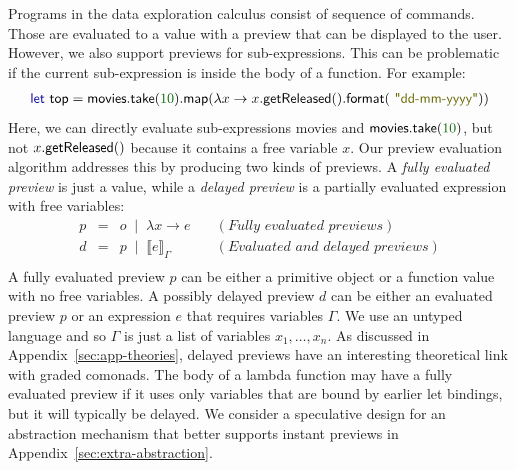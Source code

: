 \documentclass[english,crc]{programming}
\theoremstyle{plain}
\theoremstyle{definition}
\newcommand{\lsep}{\;\;|\;\;}
\newcommand{\num}[1]{\textcolor{numclr}{#1}}
\newcommand{\str}[1]{\textnormal{\textcolor{strclr}{\sffamily "#1"}}}
\newcommand{\ident}[1]{\textnormal{\textcolor{idclr}{\sffamily #1}}}
\newcommand{\kvd}[1]{\textnormal{\textcolor{kvdclr}{\sffamily #1}}}
\begin{document}
Programs in the data exploration calculus consist of sequence of commands. Those are
evaluated to a value with a preview that can be displayed to the user. However, we also support
previews for sub-expressions. This can be problematic if the current sub-expression is inside
the body of a function. For example:
%
\begin{equation*}
\begin{array}{l}
\kvd{let}~\ident{top} = \ident{movies}.\ident{take}(\num{10}).\ident{map}(\lambda x \rightarrow x.\ident{getReleased}().\ident{format}(\str{dd-mm-yyyy}))
\end{array}
\end{equation*}
%
Here, we can directly evaluate sub-expressions \ident{movies} and $\ident{movies}.\ident{take}(\num{10})$,
but not $x.\ident{getReleased}()$ because it contains a free variable $x$. Our preview evaluation algorithm addresses this by
producing two kinds of previews. A \emph{fully evaluated preview} is just a value, while
a \emph{delayed preview} is a partially evaluated expression with free variables:
%
\begin{equation*}
\begin{array}{rcll}
p&=&o \lsep  \lambda x\rightarrow e&\quad(\textit{Fully evaluated previews})\\
d&=&p \lsep  \llbracket e \rrbracket_\Gamma&\quad(\textit{Evaluated and delayed previews})\\
\end{array}
\end{equation*}
%
A fully evaluated preview $p$ can be either a primitive object or a function value with no free
variables. A possibly delayed preview $d$ can be either an evaluated preview $p$ or an expression
$e$ that requires variables $\Gamma$. We use an untyped language and so $\Gamma$ is just a list of
variables $x_1, \ldots, x_n$. As discussed in Appendix~\ref{sec:app-theories},
delayed previews have an interesting theoretical link with graded comonads.
The body of a lambda function may have a fully evaluated preview if it uses only variables that
are bound by earlier let bindings, but it will typically be delayed. We consider a speculative
design for an abstraction mechanism that better supports instant previews in
Appendix~\ref{sec:extra-abstraction}.

\end{document}
